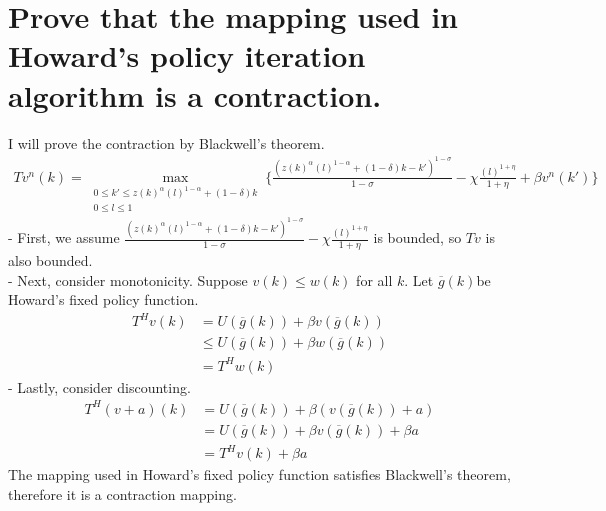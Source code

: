 \documentclass{article}
\begin{document}
\section{Prove that the mapping used in Howard’s policy iteration algorithm is a contraction.}
I will prove the contraction by Blackwell's theorem.\\
\begin{equation}
\begin{split}
Tv^{n}(k) = \max\limits_{\begin{smallmatrix}0\leq k' \leq z(k)^{\alpha}(l)^{1-\alpha}+ (1-\delta)k\\ 0\leq l \leq 1\end{smallmatrix}} \{\frac{(z(k)^{\alpha}(l)^{1-\alpha}+ (1-\delta)k-k')^{1-\sigma}}{1-\sigma}-\chi \frac{(l)^{1+\eta}}{1+\eta}+\beta v^n(k')\}
\end{split}
\end{equation}
- First, we assume $\frac{(z(k)^{\alpha}(l)^{1-\alpha}+ (1-\delta)k-k')^{1-\sigma}}{1-\sigma}-\chi \frac{(l)^{1+\eta}}{1+\eta}$ is bounded, so $Tv$ is also bounded.\\
- Next, consider monotonicity. Suppose $v(k)\leq w(k)$ for all $k$. Let $\overline{g}(k)$be Howard's fixed policy function. 
\begin{equation}
\begin{split}
T^Hv(k) &=  U(\overline{g}(k))+\beta v(\overline{g}(k))\\
&\leq U(\overline{g}(k))+\beta w(\overline{g}(k))\\
&= T^Hw(k)
\end{split}
\end{equation}
- Lastly, consider discounting.
\begin{equation}
\begin{split}
T^H(v+a)(k) &=  U(\overline{g}(k))+\beta (v(\overline{g}(k))+a)\\
&= U(\overline{g}(k))+\beta v(\overline{g}(k))+\beta a\\
&= T^Hv(k) + \beta a
\end{split}
\end{equation}
The mapping used in Howard's fixed policy function satisfies Blackwell's theorem, therefore it is a contraction mapping.
\end{document}
